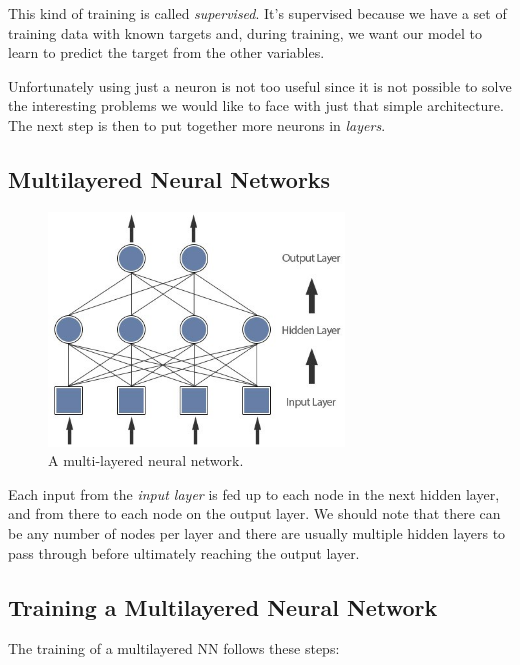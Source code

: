 This kind of training is called \emph{supervised}. It's supervised
because we have a set of training data with known targets and, during
training, we want our model to learn to predict the target from the
other variables.

Unfortunately using just a neuron is not too useful since it is not
possible to solve the interesting problems we would like to face with
just that simple architecture. The next step is then to put together
more neurons in \emph{layers}.

\subsection{Multilayered Neural Networks}\label{multi-layered-neural-networks}

\begin{figure}[htb]
	\centering
	\includegraphics[width=0.7\textwidth]{figures/multilayer.jpeg}
	\caption{A multi-layered neural network.}
\end{figure}

Each input from the \emph{input layer} is fed up to each node in the
next hidden layer, and from there to each node on the output layer. We
should note that there can be any number of nodes per layer and there
are usually multiple hidden layers to pass through before ultimately
reaching the output layer.

\subsection{Training a Multilayered Neural 		Network}\label{training-a-multilayered-neural-network}

The training of a multilayered NN follows these steps:

